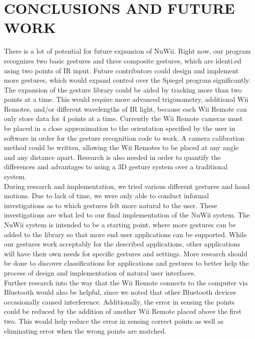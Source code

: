 \documentclass[a4paper,twoside]{article}
\begin{document}
\section{\uppercase{Conclusions and Future Work}} There is a lot of potential
for future expansion of NuWii. Right now, our program recognizes two basic
gestures and three composite gestures, which are identi.ed using two points of
IR input. Future contributors could design and implement more gestures, which
would expand control over the Spiegel program significantly. The expansion of
the gesture library could be aided by tracking more than two points at a time.
This would require more advanced trigonometry, additional Wii Remotes, and/or
different wavelengths of IR light, because each Wii Remote can only store data
for 4 points at a time. Currently the Wii Remote cameras must be placed in a
close approximation to the orientation specified by the user in software in
order for the gesture recognition code to work. A camera calibration method
could be written, allowing the Wii Remotes to be placed at any angle and any
distance apart.  Research is also needed in order to quantify the differences
and advantages to using a 3D gesture system over a traditional system. \\

During research and implementation, we tried various different gestures and
hand motions. Due to lack of time, we were only able to conduct informal
investigations as to which gestures felt more natural to the user. These
investigations are what led to our final implementation of the NuWii system.
The NuWii system is intended to be a starting point, where more gestures can be
added to the library so that more end user applications can be supported. While
our gestures work acceptably for the described applications, other applications
will have their own needs for specific gestures and settings. More research
should be done to discover classifications for applications and gestures to
better help the process of design and implementation of natural user
interfaces.\\ 

Further research into the way that the Wii Remote connects to the
computer via Bluetooth would also be helpful, since we noted that other
Bluetooth devices occasionally caused interference. Additionally, the error in
sensing the points could be reduced by the addition of another Wii Remote placed
above the first two. This would help reduce the error in sensing correct points
as well as eliminating error when the wrong points are matched.\\ 
\end{document}
